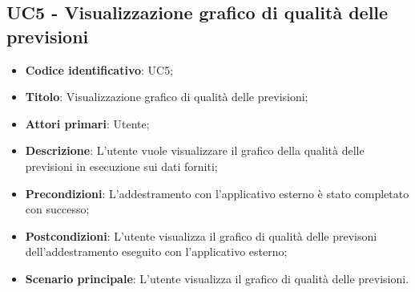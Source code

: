 \subsection{UC5 - Visualizzazione grafico di qualità delle previsioni}
\begin{itemize}
	\item \textbf{Codice identificativo}: UC5;
	\item \textbf{Titolo}: Visualizzazione grafico di qualità delle previsioni;
	\item \textbf{Attori primari}: Utente;
	\item \textbf{Descrizione}: L'utente vuole visualizzare il grafico della qualità delle previsioni in esecuzione sui dati forniti;
	\item \textbf{Precondizioni}: L'addestramento con l'applicativo esterno è stato completato con successo;
	\item \textbf{Postcondizioni}: L'utente visualizza il grafico di qualità delle previsoni dell'addestramento eseguito con l'applicativo esterno;
	\item \textbf{Scenario principale}: L'utente visualizza il grafico di qualità delle previsioni.
\end{itemize} 
